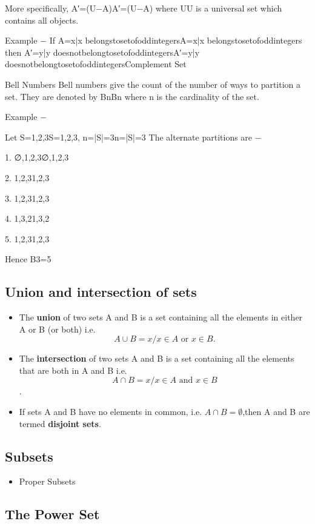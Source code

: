 \documentclass[12pt]{article}
\begin{document}
{More specifically, A′=(U−A)A′=(U−A) where UU is a universal set which contains all objects.

Example − If A={x|x belongstosetofoddintegers}A={x|x belongstosetofoddintegers} then A′={y|y doesnotbelongtosetofoddintegers}A′={y|y doesnotbelongtosetofoddintegers}Complement Set


Bell Numbers
Bell numbers give the count of the number of ways to partition a set. They are denoted by BnBn where n is the cardinality of the set.

Example −

Let S={1,2,3}S={1,2,3}, n=|S|=3n=|S|=3
The alternate partitions are −

1. ∅,{1,2,3}∅,{1,2,3}

2. {1},{2,3}{1},{2,3}

3. {1,2},{3}{1,2},{3}

4. {1,3},{2}{1,3},{2}

5. {1},{2},{3}{1},{2},{3}

Hence B3=5
\newpage
\subsection*{Union and intersection of sets}

\begin{itemize}
\item The \textbf{union} of two sets A and B is a set containing all the elements in
either A or B (or both)
i.e. 
\[A \cup B = {x / x \in A \mbox{ or } x \in B}.\]
\item The \textbf{intersection} of two sets A and B is a set containing all the elements
that are both in A and B
i.e. 
\[A \cap B = {x / x \in A \mbox{ and }x \in B}\].

\item If sets A and B have no elements in common, i.e. $A \cap B = \emptyset$,then A and B
are termed \textbf{disjoint sets}.
\end{itemize}
\newpage
\subsection*{Subsets}

\begin{itemize}
\item Proper Subsets
\end{itemize}
\subsection*{The Power Set}

}
\end{document}
